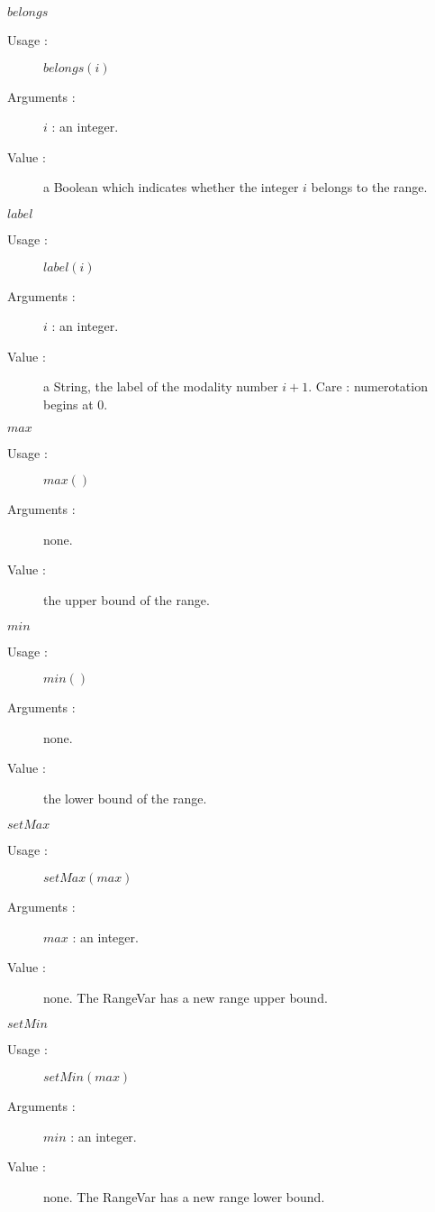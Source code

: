 \begin{description}
\begin{description}
  \item $belongs$
    \begin{description}
    \item[Usage :]  $belongs(i)$
    \item[Arguments :] $i$ : an integer.
    \item[Value :]  a Boolean which indicates whether the integer $i$ belongs to the range.
    \end{description}
    \bigskip

  \item $label$
    \begin{description}
    \item[Usage :]  $label(i)$
    \item[Arguments :] $i$ : an integer.
    \item[Value :]  a String, the label of the modality number $i+1$. Care : numerotation begins at 0.
    \end{description}
    \bigskip

  \item $max$
    \begin{description}
    \item[Usage :]  $max()$
    \item[Arguments :] none.
    \item[Value :]  the upper bound of the range.
    \end{description}
    \bigskip

  \item $min$
    \begin{description}
    \item[Usage :]  $min()$
    \item[Arguments :] none.
    \item[Value :]  the lower bound of the range.
    \end{description}
    \bigskip

  \item $setMax$
    \begin{description}
    \item[Usage :]  $setMax(max)$
    \item[Arguments :] $max$ : an integer.
    \item[Value :]  none. The RangeVar has a new range upper bound.
    \end{description}
    \bigskip

  \item $setMin$
    \begin{description}
    \item[Usage :]  $setMin(max)$
    \item[Arguments :] $min$ : an integer.
    \item[Value :]  none. The RangeVar has a new range lower bound.
    \end{description}
    \bigskip



\end{description}
\end{description}
